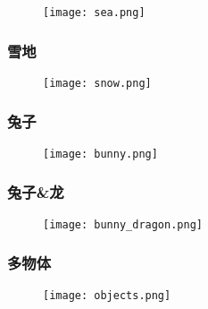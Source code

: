 \documentclass[14pt]{scrartcl} %
\begin{document}
\begin{figure}[h] %
	\centering
	\texttt{[image: sea.png]} %
\end{figure}

\subsubsection{雪地}

\begin{figure}[h] %
	\centering
	\texttt{[image: snow.png]} %
\end{figure}

\pagebreak
\subsubsection{兔子}

\begin{figure}[h] %
	\centering
	\texttt{[image: bunny.png]} %
\end{figure}

\subsubsection{兔子\&龙}

\begin{figure}[h] %
	\centering
	\texttt{[image: bunny\_dragon.png]} %
\end{figure}

\pagebreak

\subsubsection{多物体}

\begin{figure}[h] %
	\centering
	\texttt{[image: objects.png]} %
\end{figure}
\end{document}
